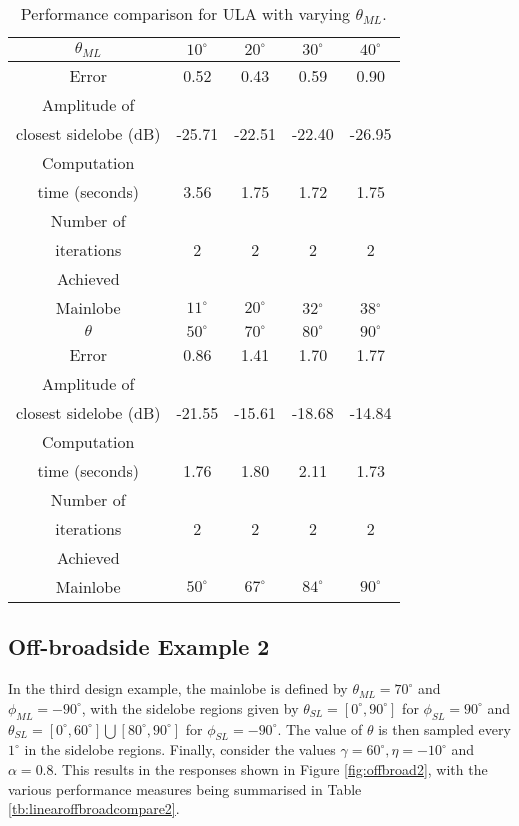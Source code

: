 \documentclass[10pt,final]{IEEEtran}
\begin{document}
\begin{table}
\caption{\rm Performance comparison for ULA with varying $\theta_{ML}$.} \centering
\begin{tabular}{|c|c|c|c|c|}
  \hline
  $\theta_{ML}$ & $10^{\circ}$ & $20^{\circ}$ & $30^{\circ}$ & $40^{\circ}$ \\
  \hline
  Error & 0.52 &0.43  &0.59  & 0.90 \\
  \hline
  Amplitude of &  &  &  &   \\
  closest sidelobe (dB)&-25.71  &-22.51  &-22.40  &-26.95  \\
  \hline
  Computation &  &  & &   \\
  time (seconds) &3.56  &1.75  &1.72  &1.75   \\
  \hline
  Number of &  &  & &   \\
  iterations & 2 & 2 & 2 &  2 \\
  \hline
  Achieved & & & & \\
   Mainlobe & $11^{\circ}$ &$20^{\circ}$  &32$^{\circ}$  &38$^{\circ}$   \\
  \hline
  \hline
  $\theta$ & $50^{\circ}$  & $70^{\circ}$ & $80^{\circ}$ & $90^{\circ}$\\
  \hline
  Error &0.86 & 1.41& 1.70& 1.77 \\
  \hline
  Amplitude of  & & & &  \\
  closest sidelobe (dB)&-21.55 &-15.61 &-18.68  & -14.84\\
  \hline
  Computation  & & & &  \\
  time (seconds) &1.76 &1.80 & 2.11&1.73  \\
  \hline
  Number of  & & & &  \\
  iterations &2 &2 &2 &2  \\
  \hline
  Achieved & & & & \\
   Mainlobe &  $50^{\circ}$&$67^{\circ}$  &$84^{\circ}$  &$90^{\circ}$   \\
  \hline
\end{tabular}
\label{tb:offula1}
\end{table}

\subsection{Off-broadside Example 2}
In the third design example, the mainlobe is defined by $\theta_{ML}=70^{\circ}$ and $\phi_{ML}=-90^{\circ}$, with the sidelobe regions given by $\theta_{SL}=[0^{\circ},90^{\circ}]$ for $\phi_{SL}=90^{\circ}$ and $\theta_{SL}=[0^{\circ},60^{\circ}]\bigcup[80^{\circ},90^{\circ}]$ for $\phi_{SL}=-90^{\circ}$.  The value of $\theta$ is then sampled every $1^{\circ}$ in the sidelobe regions.  Finally, consider the values $\gamma=60^{\circ}, \eta=-10^{\circ}$ and $\alpha=0.8$.  This results in the responses shown in Figure \ref{fig:offbroad2}, with the various performance measures being summarised in Table \ref{tb:linearoffbroadcompare2}.
\end{document}
